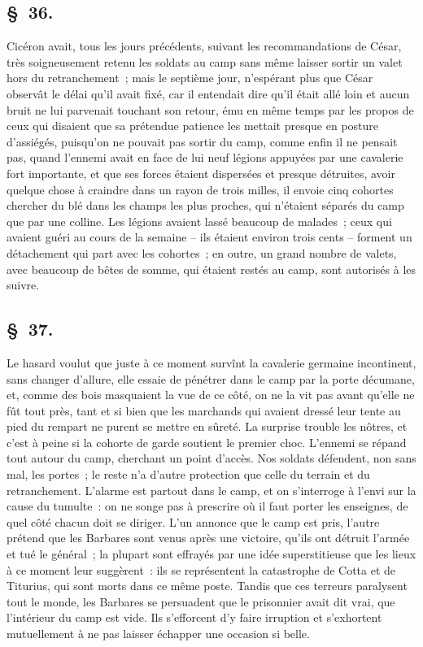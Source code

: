 \documentclass[french,twoside]{book} %
\begin{document}
\subsection[{§ 36.}]{ \textsc{§ 36.} }
\noindent Cicéron avait, tous les jours précédents, suivant les recommandations de César, très soigneusement retenu les soldats au camp sans même laisser sortir un valet hors du retranchement ; mais le septième jour, n’espérant plus que César observât le délai qu’il avait fixé, car il entendait dire qu’il était allé loin et aucun bruit ne lui parvenait touchant son retour, ému en même temps par les propos de ceux qui disaient que sa prétendue patience les mettait presque en posture d’assiégés, puisqu’on ne pouvait pas sortir du camp, comme enfin il ne pensait pas, quand l’ennemi avait en face de lui neuf légions appuyées par une cavalerie fort importante, et que ses forces étaient dispersées et presque détruites, avoir quelque chose à craindre dans un rayon de trois milles, il envoie cinq cohortes chercher du blé dans les champs les plus proches, qui n’étaient séparés du camp que par une colline. Les légions avaient lassé beaucoup de malades ; ceux qui avaient guéri au cours de la semaine – ils étaient environ trois cents – forment un détachement qui part avec les cohortes ; en outre, un grand nombre de valets, avec beaucoup de bêtes de somme, qui étaient restés au camp, sont autorisés à les suivre.
\subsection[{§ 37.}]{ \textsc{§ 37.} }
\noindent Le hasard voulut que juste à ce moment survînt la cavalerie germaine incontinent, sans changer d’allure, elle essaie de pénétrer dans le camp par la porte décumane, et, comme des bois masquaient la vue de ce côté, on ne la vit pas avant qu’elle ne fût tout près, tant et si bien que les marchands qui avaient dressé leur tente au pied du rempart ne purent se mettre en sûreté. La surprise trouble les nôtres, et c’est à peine si la cohorte de garde soutient le premier choc. L'ennemi se répand tout autour du camp, cherchant un point d’accès. Nos soldats défendent, non sans mal, les portes ; le reste n’a d’autre protection que celle du terrain et du retranchement. L'alarme est partout dans le camp, et on s’interroge à l’envi sur la cause du tumulte : on ne songe pas à prescrire où il faut porter les enseignes, de quel côté chacun doit se diriger. L'un annonce que le camp est pris, l’autre prétend que les Barbares sont venus après une victoire, qu’ils ont détruit l’armée et tué le général ; la plupart sont effrayés par une idée superstitieuse que les lieux à ce moment leur suggèrent : ils se représentent la catastrophe de Cotta et de Titurius, qui sont morts dans ce même poste. Tandis que ces terreurs paralysent tout le monde, les Barbares se persuadent que le prisonnier avait dit vrai, que l’intérieur du camp est vide. Ils s’efforcent d’y faire irruption et s’exhortent mutuellement à ne pas laisser échapper une occasion si belle.
\end{document}
